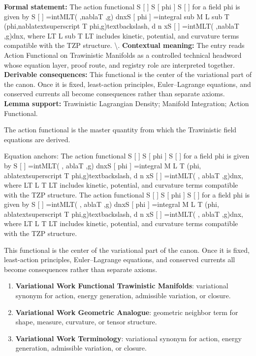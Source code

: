 \begingroup\footnotesize\setlength{\emergencystretch}{3em}\sloppy
\textbf{Formal statement:} The action functional S [   ] S [ phi ] S [   ] for a field  phi  is given by S [   ] =intMLT( ,nablaT ,g) dnxS [ phi ] =integral sub M L sub T (phi,nablatextsuperscript T phi,g)textbackslash, d n xS [   ] =intMLT( ,nablaT ,g)dnx, where LT L sub T LT includes kinetic, potential, and curvature terms compatible with the TZP structure. \textbackslash{}. \textbf{Contextual meaning:} The entry reads Action Functional on Trawinistic Manifolds as a controlled technical headword whose equation layer, proof route, and registry role are interpreted together. \textbf{Derivable consequences:} This functional is the center of the variational part of the canon. Once it is fixed, least-action principles, Euler--Lagrange equations, and conserved currents all become consequences rather than separate axioms. \textbf{Lemma support:} Trawinistic Lagrangian Density; Manifold Integration; Action Functional.\par
\endgroup

The action functional is the master quantity from which the Trawinistic field equations are derived.

Equation anchors: The action functional S [   ] S [ phi ] S [   ] for a field  phi  is given by S [   ] =intMLT( , ablaT ,g) dnxS [ phi ] =integral M L T (phi, ablatextsuperscript T phi,g)textbackslash, d n xS [   ] =intMLT( , ablaT ,g)dnx, where LT L T LT includes kinetic, potential, and curvature terms compatible with the TZP structure. The action functional S [   ] S [ phi ] S [   ] for a field  phi  is given by S [   ] =intMLT( , ablaT ,g) dnxS [ phi ] =integral M L T (phi, ablatextsuperscript T phi,g)textbackslash, d n xS [   ] =intMLT( , ablaT ,g)dnx, where LT L T LT includes kinetic, potential, and curvature terms compatible with the TZP structure.

This functional is the center of the variational part of the canon. Once it is fixed, least-action principles, Euler--Lagrange equations, and conserved currents all become consequences rather than separate axioms.
\endgroup

\begingroup\footnotesize\sloppy
\begin{enumerate}[leftmargin=1.35em,itemsep=1pt,topsep=1pt,parsep=0pt]
\item \textbf{Variational Work Functional Trawinistic Manifolds}: variational synonym for action, energy generation, admissible variation, or closure.
\item \textbf{Variational Work Geometric Analogue}: geometric neighbor term for shape, measure, curvature, or tensor structure.
\item \textbf{Variational Work Terminology}: variational synonym for action, energy generation, admissible variation, or closure.
\end{enumerate}
\endgroup

